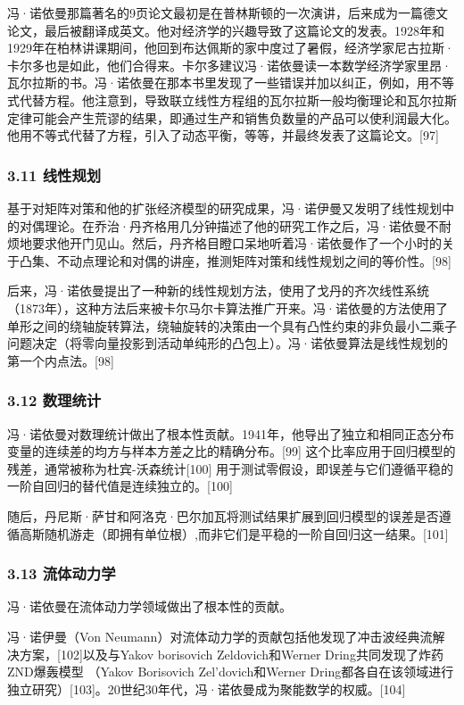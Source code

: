 冯·诺依曼那篇著名的9页论文最初是在普林斯顿的一次演讲，后来成为一篇德文论文，最后被翻译成英文。他对经济学的兴趣导致了这篇论文的发表。1928年和1929年在柏林讲课期间，他回到布达佩斯的家中度过了暑假，经济学家尼古拉斯·卡尔多也是如此，他们合得来。卡尔多建议冯·诺依曼读一本数学经济学家里昂·瓦尔拉斯的书。冯·诺依曼在那本书里发现了一些错误并加以纠正，例如，用不等式代替方程。他注意到，导致联立线性方程组的瓦尔拉斯一般均衡理论和瓦尔拉斯定律可能会产生荒谬的结果，即通过生产和销售负数量的产品可以使利润最大化。他用不等式代替了方程，引入了动态平衡，等等，并最终发表了这篇论文。[97]
\subsubsection{3.11 线性规划}
基于对矩阵对策和他的扩张经济模型的研究成果，冯·诺伊曼又发明了线性规划中的对偶理论。在乔治·丹齐格用几分钟描述了他的研究工作之后，冯·诺依曼不耐烦地要求他开门见山。然后，丹齐格目瞪口呆地听着冯·诺依曼作了一个小时的关于凸集、不动点理论和对偶的讲座，推测矩阵对策和线性规划之间的等价性。[98]

后来，冯·诺依曼提出了一种新的线性规划方法，使用了戈丹的齐次线性系统（1873年），这种方法后来被卡尔马尔卡算法推广开来。冯·诺依曼的方法使用了单形之间的绕轴旋转算法，绕轴旋转的决策由一个具有凸性约束的非负最小二乘子问题决定（将零向量投影到活动单纯形的凸包上）。冯·诺依曼算法是线性规划的第一个内点法。[98]
\subsubsection{3.12 数理统计}
冯·诺依曼对数理统计做出了根本性贡献。1941年，他导出了独立和相同正态分布变量的连续差的均方与样本方差之比的精确分布。[99] 这个比率应用于回归模型的残差，通常被称为杜宾-沃森统计[100] 用于测试零假设，即误差与它们遵循平稳的一阶自回归的替代值是连续独立的。[100]

随后，丹尼斯·萨甘和阿洛克·巴尔加瓦将测试结果扩展到回归模型的误差是否遵循高斯随机游走（即拥有单位根）,而非它们是平稳的一阶自回归这一结果。[101]
\subsubsection{3.13 流体动力学}
冯·诺依曼在流体动力学领域做出了根本性的贡献。

冯·诺伊曼（Von Neumann）对流体动力学的贡献包括他发现了冲击波经典流解决方案，[102]以及与Yakov borisovich Zeldovich和Werner Dring共同发现了炸药ZND爆轰模型 （Yakov Borisovich Zel'dovich和Werner Dring都各自在该领域进行独立研究）[103]。20世纪30年代，冯·诺依曼成为聚能数学的权威。[104]

